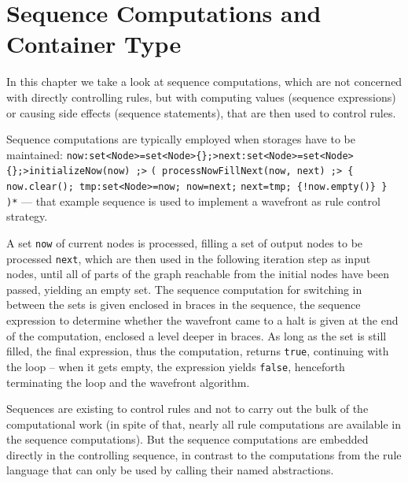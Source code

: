 
\chapter{Sequence Computations and Container Type}\label{seqcomp}

In this chapter we take a look at sequence computations, which are not concerned with directly controlling rules, but with computing values (sequence expressions) or causing side effects (sequence statements), that are then used to control rules.

\begin{example}
Sequence computations are typically employed when storages have to be maintained:
\verb#now:set<Node>=set<Node>{};>next:set<Node>=set<Node>{};>initializeNow(now) ;>#
\verb#( processNowFillNext(now, next) ;> { now.clear(); tmp:set<Node>=now; now=next;#
\verb#next=tmp; {!now.empty()} } )*#
--- that example sequence is used to implement a wavefront as rule control strategy.

A set \texttt{now} of current nodes is processed, filling a set of output nodes to be processed \texttt{next}, which are then used in the following iteration step as input nodes, until all of parts of the graph reachable from the initial nodes have been passed, yielding an empty set.
The sequence computation for switching in between the sets is given enclosed in braces in the sequence, 
the sequence expression to determine whether the wavefront came to a halt is given at the end of the computation,
enclosed a level deeper in braces.
As long as the set is still filled, the final expression, thus the computation, returns \texttt{true}, continuing with the loop -- when it gets empty, the expression yields \texttt{false}, henceforth terminating the loop and the wavefront algorithm.
\end{example}

Sequences are existing to control rules and not to carry out the bulk of the computational work (in spite of that, nearly all rule computations are available in the sequence computations).
But the sequence computations are embedded directly in the controlling sequence, in contrast to the computations from the rule language that can only be used by calling their named abstractions.

